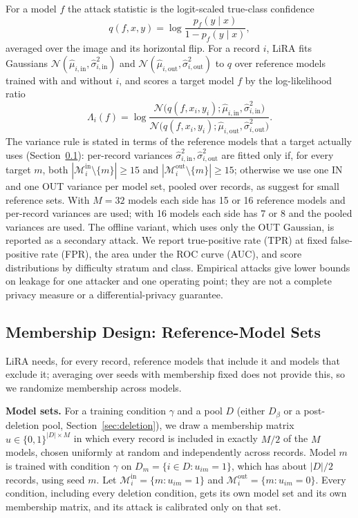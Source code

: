 \documentclass{article} %
\newcommand{\inset}{\mathcal{M}^{\mathrm{in}}}
\newcommand{\outset}{\mathcal{M}^{\mathrm{out}}}
\begin{document}
For a model $f$ the attack statistic is the logit-scaled true-class confidence
\begin{equation}
q(f,x,y)=\log\frac{p_f(y\mid x)}{1-p_f(y\mid x)},
\label{eq:q}
\end{equation}
averaged over the image and its horizontal flip. For a record $i$, LiRA fits Gaussians $\mathcal{N}(\hat\mu_{i,\mathrm{in}},\hat\sigma_{i,\mathrm{in}}^2)$ and $\mathcal{N}(\hat\mu_{i,\mathrm{out}},\hat\sigma_{i,\mathrm{out}}^2)$ to $q$ over reference models trained with and without $i$, and scores a target model $f$ by the log-likelihood ratio
\begin{equation}
\Lambda_i(f)=\log\frac{\mathcal{N}\big(q(f,x_i,y_i);\hat\mu_{i,\mathrm{in}},\hat\sigma_{i,\mathrm{in}}^2\big)}{\mathcal{N}\big(q(f,x_i,y_i);\hat\mu_{i,\mathrm{out}},\hat\sigma_{i,\mathrm{out}}^2\big)}.
\label{eq:lira}
\end{equation}
The variance rule is stated in terms of the reference models that a target actually uses (Section~\ref{sec:membership}): per-record variances $\hat\sigma_{i,\mathrm{in}}^2,\hat\sigma_{i,\mathrm{out}}^2$ are fitted only if, for every target $m$, both $|\inset_i\setminus\{m\}|\geq 15$ and $|\outset_i\setminus\{m\}|\geq 15$; otherwise we use one IN and one OUT variance per model set, pooled over records, as \citet{carlini2022lira} suggest for small reference sets. With $M=32$ models each side has 15 or 16 reference models and per-record variances are used; with 16 models each side has 7 or 8 and the pooled variances are used. The offline variant, which uses only the OUT Gaussian, is reported as a secondary attack. We report true-positive rate (TPR) at fixed false-positive rate (FPR), the area under the ROC curve (AUC), and score distributions by difficulty stratum and class. Empirical attacks give lower bounds on leakage for one attacker and one operating point; they are not a complete privacy measure or a differential-privacy guarantee.

\subsection{Membership Design: Reference-Model Sets}
\label{sec:membership}

LiRA needs, for every record, reference models that include it and models that exclude it; averaging over seeds with membership fixed does not provide this, so we randomize membership across models.

\textbf{Model sets.} For a training condition $\gamma$ and a pool $D$ (either $D_\beta$ or a post-deletion pool, Section~\ref{sec:deletion}), we draw a membership matrix $u\in\{0,1\}^{|D|\times M}$ in which every record is included in exactly $M/2$ of the $M$ models, chosen uniformly at random and independently across records. Model $m$ is trained with condition $\gamma$ on $D_m=\{i\in D:u_{im}=1\}$, which has about $|D|/2$ records, using seed $m$. Let $\inset_i=\{m:u_{im}=1\}$ and $\outset_i=\{m:u_{im}=0\}$. Every condition, including every deletion condition, gets its own model set and its own membership matrix, and its attack is calibrated only on that set.
\end{document}
